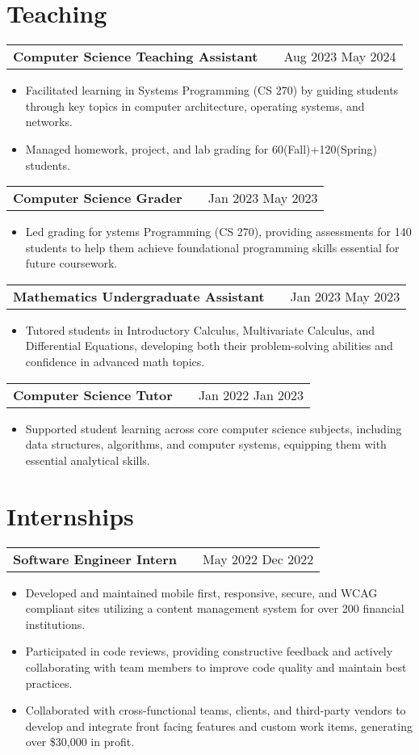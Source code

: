 \documentclass[a4paper,12pt]{article}
\makeatletter
\newenvironment{joblong}[2]
    {
    \begin{tabularx}{\linewidth}{@{}l X r@{}}
    \textbf{#1} & \hfill &  #2 \\[3.75pt]
    \end{tabularx}
    \begin{minipage}[t]{\linewidth}
    \begin{itemize}[nosep,after=\strut, leftmargin=1em, itemsep=3pt,label=--]
    }
    {
    \end{itemize}
    \end{minipage}    
    }
\makeatother
\begin{document}
\section{Teaching}

\begin{joblong}{Computer Science Teaching Assistant}{Aug 2023 May 2024} %
\item Facilitated learning in Systems Programming (CS 270) by guiding students through key topics in computer architecture, operating systems, and networks. %
\item Managed homework, project, and lab grading for 60(Fall)+120(Spring) students. %
\end{joblong}

\begin{joblong}{Computer Science Grader}{Jan 2023 May 2023} %
\item Led grading for ystems Programming (CS 270), providing assessments for 140 students to help them achieve foundational programming skills essential for future coursework. %
\end{joblong}

\begin{joblong}{Mathematics Undergraduate Assistant}{Jan 2023 May 2023} %
\item Tutored students in Introductory Calculus, Multivariate Calculus, and Differential Equations, developing both their problem-solving abilities and confidence in advanced math topics. %
\end{joblong}

\begin{joblong}{Computer Science Tutor}{Jan 2022 Jan 2023} %
\item Supported student learning across core computer science subjects, including data structures, algorithms, and computer systems, equipping them with essential analytical skills. %
\end{joblong}


\section{Internships}

\begin{joblong}{Software Engineer Intern}{May 2022 Dec 2022} %
\item Developed and maintained mobile first, responsive, secure, and WCAG compliant sites utilizing a content management system for over 200 financial institutions. %
\item Participated in code reviews, providing constructive feedback and actively collaborating with team members to improve code quality and maintain best practices. %
\item Collaborated with cross-functional teams, clients, and third-party vendors to develop and integrate front facing features and custom work items, generating over \$30,000 in profit. %
\end{joblong}
\end{document}
